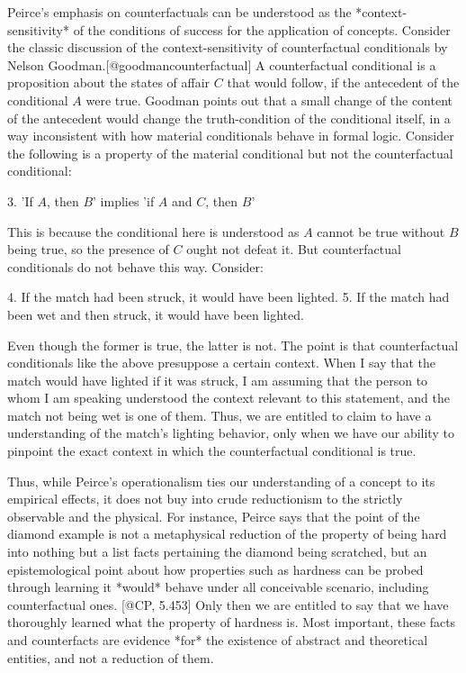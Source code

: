 Peirce's emphasis on counterfactuals can be understood as the
*context-sensitivity* of the conditions of success for the application
of concepts. Consider the classic discussion of the context-sensitivity
of counterfactual conditionals by Nelson
Goodman.{[}@goodmancounterfactual{]} A counterfactual conditional is a
proposition about the states of affair \(C\) that would follow, if the
antecedent of the conditional \(A\) were true. Goodman points out that a
small change of the content of the antecedent would change the
truth-condition of the conditional itself, in a way inconsistent with
how material conditionals behave in formal logic. Consider the following
is a property of the material conditional but not the counterfactual
conditional:

3. 'If \(A\), then \(B\)' implies 'if \(A\) and \(C\), then \(B\)'

This is because the conditional here is understood as \(A\) cannot be
true without \(B\) being true, so the presence of \(C\) ought not defeat
it. But counterfactual conditionals do not behave this way. Consider:

4. If the match had been struck, it would have been lighted. 5. If the
match had been wet and then struck, it would have been lighted.

Even though the former is true, the latter is not. The point is that
counterfactual conditionals like the above presuppose a certain context.
When I say that the match would have lighted if it was struck, I am
assuming that the person to whom I am speaking understood the context
relevant to this statement, and the match not being wet is one of them.
Thus, we are entitled to claim to have a understanding of the match's
lighting behavior, only when we have our ability to pinpoint the exact
context in which the counterfactual conditional is true.

Thus, while Peirce's operationalism ties our understanding of a concept
to its empirical effects, it does not buy into crude reductionism to the
strictly observable and the physical. For instance, Peirce says that the
point of the diamond example is not a metaphysical reduction of the
property of being hard into nothing but a list facts pertaining the
diamond being scratched, but an epistemological point about how
properties such as hardness can be probed through learning it *would*
behave under all conceivable scenario, including counterfactual ones.
{[}@CP, 5.453{]} Only then we are entitled to say that we have
thoroughly learned what the property of hardness is. Most important,
these facts and counterfacts are evidence *for* the existence of
abstract and theoretical entities, and not a reduction of them.

